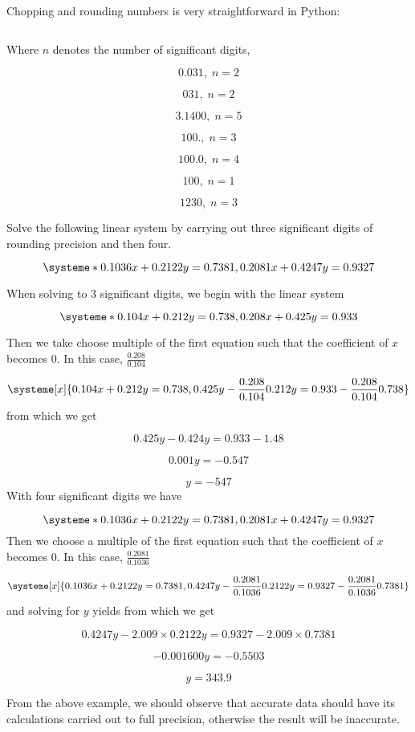 Chopping and rounding numbers is very straightforward in Python:
\inputminted[frame = lines, bgcolor = lightgray, linenos]{python}{PythonSources/chopRound.py}

\begin{example}
		Where \(n\) denotes the number of significant digits,
			
\[
0.031,\; n = 2
\]
			
\[
031,\; n = 2
\]
			
\[
3.1400,\; n = 5
\]
			
\[
100.,\; n = 3
\]
			
\[
100.0,\; n = 4
\]
			
\[
100,\; n = 1
\]
			
\[
1230,\; n = 3
\]
	
\end{example}

	
\begin{example}
		Solve the following linear system by carrying out three significant digits of rounding precision and then four.
			
\[
\systeme*{0.1036x + 0.2122y = 0.7381, 0.2081x + 0.4247y = 0.9327}
\]

		When solving to 3 significant digits, we begin with the linear system
			
\[
\systeme*{0.104x + 0.212y = 0.738, 0.208x + 0.425y = 0.933}
\]

		Then we take choose multiple of the first equation such that the coefficient of \(x\) becomes 0. In this case, \(\frac{0.208}{0.104}\)
			
\[
\systeme[x]{0.104x + 0.212y = 0.738, 0.425y - \frac{0.208}{0.104}0.212y = 0.933 - \frac{0.208}{0.104}0.738}
\]
		from which we get
			
\[
0.425y - 0.424y = 0.933 - 1.48
\]
			
\[
0.001y = -0.547
\]
			
\[
y = -547
\]
		With four significant digits we have
			
\[
\systeme*{0.1036x + 0.2122y = 0.7381, 0.2081x + 0.4247y = 0.9327}
\]
		Then we choose a multiple of the first equation such that the coefficient of \(x\) becomes 0. In this case, \(\frac{0.2081}{0.1036}\)
			
\[
\systeme[x]{0.1036x + 0.2122y = 0.7381, 0.4247y - \frac{0.2081}{0.1036}0.2122y = 0.9327 - \frac{0.2081}{0.1036}0.7381}
\]
		and solving for \(y\) yields
		from which we get
			
\[
0.4247y - 2.009 \times 0.2122y = 0.9327 - 2.009 \times 0.7381
\]
			
\[
-0.001600y = -0.5503
\]
			
\[
y = 343.9
\]
	
\end{example}

	From the above example, we should observe that accurate data should have its calculations carried out to full precision, otherwise the result will be inaccurate.
